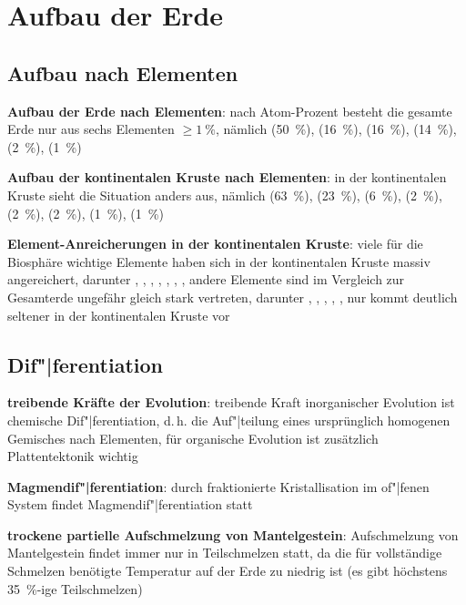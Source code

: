 \section{%
    Aufbau der Erde%
}

\subsection{%
    Aufbau nach Elementen%
}

\textbf{Aufbau der Erde nach Elementen}:
nach Atom-Prozent besteht die gesamte Erde nur aus sechs Elementen $\ge \SI{1}{\percent}$,
nämlich
 (\SI{50}{\percent}),
 (\SI{16}{\percent}),
 (\SI{16}{\percent}),
 (\SI{14}{\percent}),
 (\SI{2}{\percent}),
 (\SI{1}{\percent})

\textbf{Aufbau der kontinentalen Kruste nach Elementen}:
in der kontinentalen Kruste sieht die Situation anders aus, nämlich
 (\SI{63}{\percent}),
 (\SI{23}{\percent}),
 (\SI{6}{\percent}),
 (\SI{2}{\percent}),
 (\SI{2}{\percent}),
 (\SI{2}{\percent}),
 (\SI{1}{\percent}),
 (\SI{1}{\percent})

\textbf{Element-Anreicherungen in der kontinentalen Kruste}:
viele für die Biosphäre wichtige Elemente haben sich in der kontinentalen Kruste massiv
angereichert, darunter , , , , , , ,
andere Elemente sind im Vergleich zur Gesamterde ungefähr gleich stark vertreten,
darunter , , , , ,
nur  kommt deutlich seltener in der kontinentalen Kruste vor

\subsection{%
    Dif"|ferentiation%
}

\textbf{treibende Kräfte der Evolution}:
treibende Kraft inorganischer Evolution ist chemische Dif"|ferentiation,
d.\,h. die Auf"|teilung eines ursprünglich homogenen Gemisches nach Elementen,
für organische Evolution ist zusätzlich Plattentektonik wichtig

\textbf{Magmendif"|ferentiation}:
durch fraktionierte Kristallisation im of"|fenen System findet Magmendif"|ferentiation statt

\textbf{trockene partielle Aufschmelzung von Mantelgestein}:
Aufschmelzung von Mantelgestein findet immer nur in Teilschmelzen statt,
da die für vollständige Schmelzen benötigte Temperatur auf der Erde zu niedrig ist
(es gibt höchstens \SI{35}{\percent}-ige Teilschmelzen)

